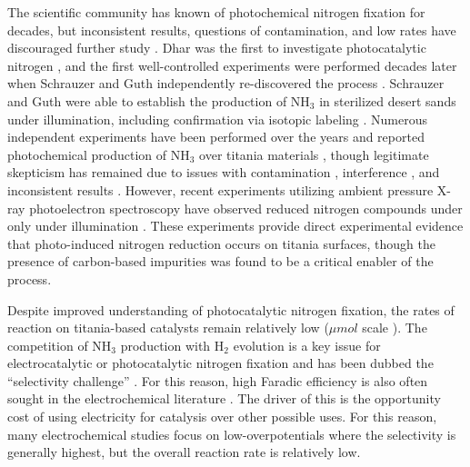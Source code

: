 The scientific community has known of photochemical nitrogen fixation for decades, but inconsistent results, questions of contamination, and low rates have discouraged further study \cite{Medford_2017, Davies1995}. Dhar was the first to investigate photocatalytic nitrogen \cite{Dhar_1941}, and the first well\hyp{}controlled experiments were performed decades later when Schrauzer and Guth independently re-discovered the process \cite{Schrauzer_1977}. Schrauzer and Guth were able to establish the production of NH$_3$ in sterilized desert sands under illumination, \cite{Schrauzer_1977} including confirmation via isotopic labeling \cite{Schrauzer_1983}. Numerous independent experiments have been performed over the years and reported photochemical production of NH$_3$ over titania materials \cite{Bickley_1979,Augugliaro_1982,Soria_1991,Li_2018,Yuan_2013,Hirakawa_2017}, though legitimate skepticism has remained due to issues with contamination \cite{edwards1992opinion, Davies1995, davies1993reply}, interference \cite{Gao_2018,Cui2018}, and inconsistent results \cite{Medford_2017}. However, recent experiments utilizing ambient pressure X\hyp{}ray photoelectron spectroscopy have observed reduced nitrogen compounds under only under illumination \cite{Comer_2018b}. These experiments provide direct experimental evidence that photo\hyp{}induced nitrogen reduction occurs on titania surfaces, though the presence of carbon-based impurities was found to be a critical enabler of the process. %

Despite improved understanding of photocatalytic nitrogen fixation, the rates of reaction on titania-based catalysts remain relatively low ($\mu mol$ scale \cite{Hirakawa_2017}). The competition of NH$_3$ production with H$_2$ evolution is a key issue for electrocatalytic or photocatalytic nitrogen fixation and has been dubbed the ``selectivity challenge'' \cite{Singh_2017}. For this reason, high Faradic efficiency is also often sought in the electrochemical literature \cite{McPherson_2019}. The driver of this is the opportunity cost of using electricity for catalysis over other possible uses. For this reason, many electrochemical studies focus on low-overpotentials where the selectivity is generally highest, but the overall reaction rate is relatively low.

